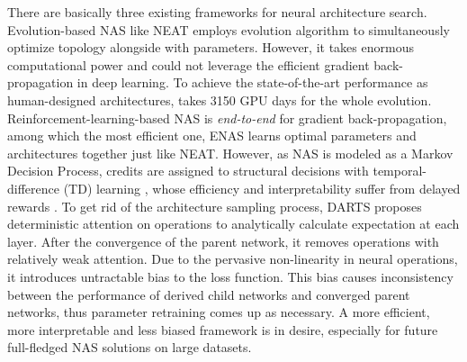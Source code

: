 \documentclass{article} \usepackage{iclr2019_conference,times}
\begin{document}
There are basically three existing frameworks for neural architecture search. Evolution-based NAS like NEAT \citep{stanley2002evolving} employs evolution algorithm to simultaneously optimize topology alongside with parameters. However, it takes enormous computational power and could not leverage the efficient gradient back-propagation in deep learning. To achieve the state-of-the-art performance as human-designed architectures, \citet{real2018regularized} takes 3150 GPU days for the whole evolution. Reinforcement-learning-based NAS is \textit{end-to-end} for gradient back-propagation, among which the most efficient one, ENAS \citep{pham2018efficient} learns optimal parameters and architectures together just like NEAT. However, as NAS is modeled as a Markov Decision Process, credits are assigned to structural decisions with temporal-difference (TD) learning \citep{sutton1998reinforcement}, whose efficiency and interpretability suffer from delayed rewards \citep{arjona2018rudder}. To get rid of the architecture sampling process, DARTS \citep{liu2018darts} proposes deterministic attention on operations to analytically calculate expectation at each layer. After the convergence of the parent network, it removes operations with relatively weak attention. Due to the pervasive non-linearity in neural operations, it introduces untractable bias to the loss function. This bias causes inconsistency between the performance of derived child networks and converged parent networks, thus parameter retraining comes up as necessary. A more efficient, more interpretable and less biased framework is in desire, especially for future full-fledged NAS solutions on large datasets.
\end{document}
